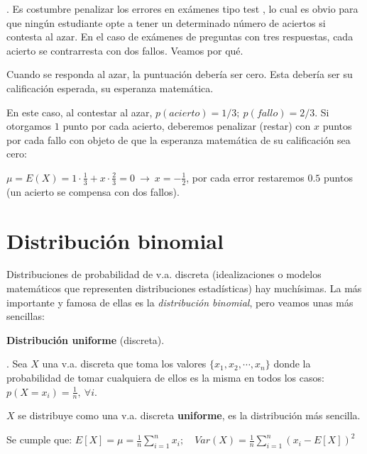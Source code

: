 \vspace{1cm}%
\begin{example}
.	Es costumbre penalizar los errores en exámenes tipo test	, lo cual es obvio para que ningún estudiante opte a tener un determinado número de aciertos si contesta al azar. En el caso de exámenes de preguntas con tres respuestas, cada acierto se contrarresta con dos fallos. Veamos por qué.

\vspace{2mm} Cuando se responda al azar, la puntuación debería ser cero. Esta debería ser su calificación esperada, su esperanza matemática.

\vspace{2mm} En este caso, al contestar al azar,  $p(acierto)=1/3;\ p(fallo)=2/3$. Si otorgamos $1$ punto por cada acierto, deberemos penalizar (restar) con $x$ puntos por cada fallo con objeto de que la esperanza matemática de su calificación sea cero:

\vspace{2mm} $\mu= E(X)=1\cdot \frac 1 3 + x \cdot \frac 2 3 =0 \ \to \ x=- \frac 1 2$, por cada error restaremos $0.5$ puntos (un acierto se compensa con dos fallos).
\end{example}


\section{Distribución binomial}


Distribuciones de probabilidad de v.a. discreta (idealizaciones o modelos matemáticos que representen distribuciones estadísticas) hay muchísimas. La más importante y famosa de ellas es la \emph{distribución binomial}, pero veamos unas más sencillas:

\vspace{15mm}  %

\textbf{\large{Distribución uniforme}} \normalsize{(discreta)}.

\begin{definition}
.	Sea $X$ una v.a. discreta que toma los valores $\{x_1,x_2,\cdots ,x_n\}$ donde la probabilidad de tomar cualquiera de ellos es la misma en todos los casos: $p(X=x_i)=\frac 1 n,\ \forall i$.

$X$ se distribuye como una v.a. discreta \textbf{uniforme}, es la distribución más sencilla.


\vspace{2mm}  Se cumple que: $\displaystyle {E}[X]=\mu=\frac{1}{n} \sum_{i=1}^{n} x_{i};\quad {Var}(X)= \frac{1}{n} \sum_{i=1}^n(x_i - {E}[X])^2$
\end{definition}


